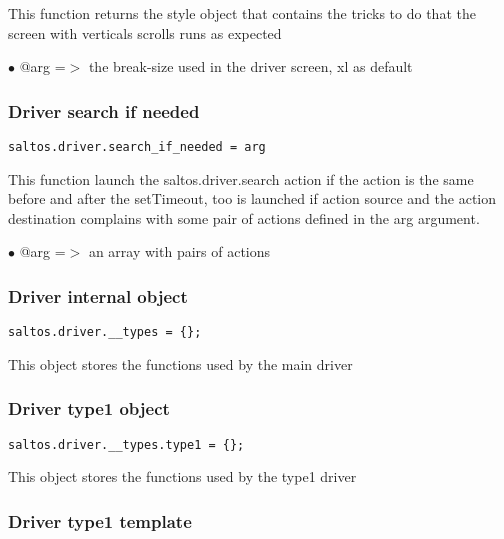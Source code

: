 \documentclass[a4paper]{article}
\begin{document}
This function returns the style object that contains the tricks to do
that the screen with verticals scrolls runs as expected

\begin{compactitem}
\item[\color{myblue}$\bullet$] @arg =$>$ the break-size used in the driver screen, xl as default
\end{compactitem}

\hypertarget{toc737}{}
\subsubsection{Driver search if needed}

\begin{lstlisting}
saltos.driver.search_if_needed = arg
\end{lstlisting}

This function launch the saltos.driver.search action if the action is the
same before and after the setTimeout, too is launched if action source and
the action destination complains with some pair of actions defined in the
arg argument.

\begin{compactitem}
\item[\color{myblue}$\bullet$] @arg =$>$ an array with pairs of actions
\end{compactitem}

\hypertarget{toc738}{}
\subsubsection{Driver internal object}

\begin{lstlisting}
saltos.driver.__types = {};
\end{lstlisting}

This object stores the functions used by the main driver

\hypertarget{toc739}{}
\subsubsection{Driver type1 object}

\begin{lstlisting}
saltos.driver.__types.type1 = {};
\end{lstlisting}

This object stores the functions used by the type1 driver

\hypertarget{toc740}{}
\subsubsection{Driver type1 template}
\end{document}
